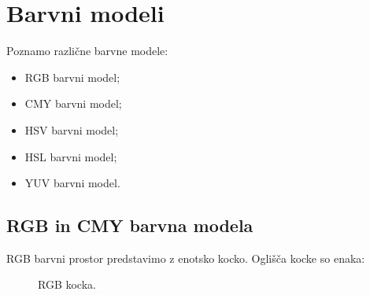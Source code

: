 \section{Barvni modeli}
Poznamo različne barvne modele:
%
\begin{itemize}
\item RGB barvni model;
\item CMY barvni model;
\item HSV barvni model;
\item HSL barvni model;
\item YUV barvni model.
\end{itemize}
%
\subsection{RGB in CMY barvna modela}
RGB barvni prostor predstavimo z enotsko kocko. Oglišča kocke so enaka:

\begin{figure}[htbp]
  \centering
  \caption{RGB kocka.}
  \label{fig:rgbcube}
\end{figure}

